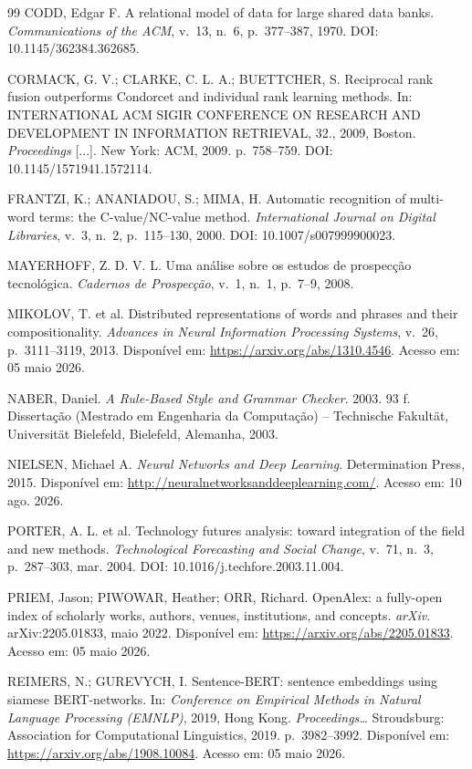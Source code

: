 \documentclass[12pt, a4paper]{article}
\begin{document}
\begin{thebibliography}{99}
CODD, Edgar F.
A relational model of data for large shared data banks.
\textit{Communications of the ACM}, v.~13, n.~6, p.~377--387, 1970.
DOI: 10.1145/362384.362685.

CORMACK, G. V.; CLARKE, C. L. A.; BUETTCHER, S.
Reciprocal rank fusion outperforms Condorcet and individual rank learning methods.
In: INTERNATIONAL ACM SIGIR CONFERENCE ON RESEARCH AND DEVELOPMENT IN
INFORMATION RETRIEVAL, 32., 2009, Boston. \textit{Proceedings} [...].
New York: ACM, 2009. p.~758--759. DOI: 10.1145/1571941.1572114.

FRANTZI, K.; ANANIADOU, S.; MIMA, H.
Automatic recognition of multi-word terms: the C-value/NC-value method.
\textit{International Journal on Digital Libraries}, v.~3, n.~2, p.~115--130, 2000.
DOI: 10.1007/s007999900023.

MAYERHOFF, Z. D. V. L.
Uma análise sobre os estudos de prospecção tecnológica.
\textit{Cadernos de Prospecção}, v.~1, n.~1, p.~7--9, 2008.

MIKOLOV, T. et al.
Distributed representations of words and phrases and their compositionality.
\textit{Advances in Neural Information Processing Systems}, v.~26,
p.~3111--3119, 2013.
Disponível em: \url{https://arxiv.org/abs/1310.4546}.
Acesso em: 05 maio 2026.

NABER, Daniel.
\textit{A Rule-Based Style and Grammar Checker}.
2003. 93 f. Dissertação (Mestrado em Engenharia da Computação) -- Technische Fakultät, Universität Bielefeld, Bielefeld, Alemanha, 2003.

NIELSEN, Michael A.
\textit{Neural Networks and Deep Learning}.
Determination Press, 2015.
Disponível em: \url{http://neuralnetworksanddeeplearning.com/}.
Acesso em: 10 ago. 2026.

PORTER, A. L. et al.
Technology futures analysis: toward integration of the field and new methods.
\textit{Technological Forecasting and Social Change}, v.~71, n.~3,
p.~287--303, mar. 2004.
DOI: 10.1016/j.techfore.2003.11.004.

PRIEM, Jason; PIWOWAR, Heather; ORR, Richard.
OpenAlex: a fully-open index of scholarly works, authors, venues, institutions, and concepts.
\textit{arXiv}. arXiv:2205.01833, maio 2022.
Disponível em: \url{https://arxiv.org/abs/2205.01833}.
Acesso em: 05 maio 2026.

REIMERS, N.; GUREVYCH, I.
Sentence-BERT: sentence embeddings using siamese BERT-networks.
In: \textit{Conference on Empirical Methods in Natural Language Processing
(EMNLP)}, 2019, Hong Kong.
\textit{Proceedings\ldots} Stroudsburg: Association for Computational Linguistics,
2019. p.~3982--3992.
Disponível em: \url{https://arxiv.org/abs/1908.10084}.
Acesso em: 05 maio 2026.


\end{thebibliography}
\end{document}
